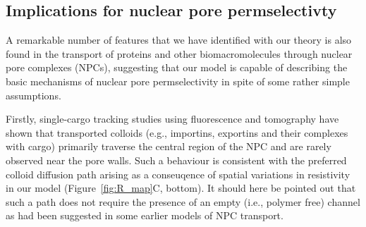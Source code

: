 \documentclass[12pt, a4paper]{article}
\begin{document}



\subsection{Implications for nuclear pore permselectivty}

A remarkable number of features that we have identified with our theory is also found in the transport of proteins and other biomacromolecules through nuclear pore complexes (NPCs), suggesting that our model is capable of describing the basic mechanisms of nuclear pore permselectivity in spite of some rather simple assumptions.

Firstly, single-cargo tracking studies using fluorescence \cite{Musser2016, Lowe2010, Lowe2015, Yang2004, Kubitscheck2000, Ma2010} and tomography \cite{Beck2007} have shown that transported colloids (e.g., importins, exportins and their complexes with cargo) primarily traverse the central region of the NPC and are rarely observed near the pore walls.
Such a behaviour is consistent with the preferred colloid diffusion path arising as a conseuqence of spatial variations in resistivity in our model (Figure~\ref{fig:R_map}C, bottom).
It should here be pointed out that such a path does not require the presence of an empty (i.e., polymer free) channel as had been suggested in some earlier models of NPC transport.
\end{document}
